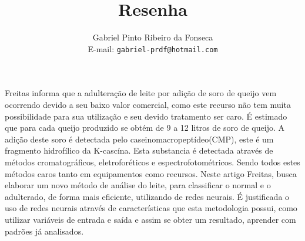 \documentclass[a4paper,11pt]{article}
\title{Resenha}
\author{Gabriel Pinto Ribeiro da Fonseca\\E-mail: {\tt gabriel-prdf@hotmail.com}}
\date{}
\begin{document}
\maketitle


\begin{multicols}{2}


Freitas\cite{ref:freitas2014} informa que a adulteração de leite por adição de soro de queijo vem ocorrendo devido a seu baixo valor comercial, como este recurso não tem muita possibilidade para sua utilização e seu devido tratamento ser caro. É estimado que para cada queijo produzido se obtém de 9 a 12 litros de soro de queijo.
A adição deste soro é detectada pelo caseinomacropeptídeo(CMP), este é um fragmento hidrofílico da K-cascína.  Esta substancia é detectada através de métodos cromatográficos, eletroforéticos e espectrofotométricos. Sendo todos estes métodos caros tanto em equipamentos como recursos.
Neste artigo Freitas\cite{ref:freitas2014}, busca elaborar um novo método de análise do leite, para classificar o normal e o adulterado, de forma mais eficiente, utilizando de redes neurais.
É justificada o uso de redes neurais através de características que esta metodologia possui, como utilizar variáveis de entrada e saída e assim se obter um resultado, aprender com padrões já analisados.


\end{multicols}
\end{document}
